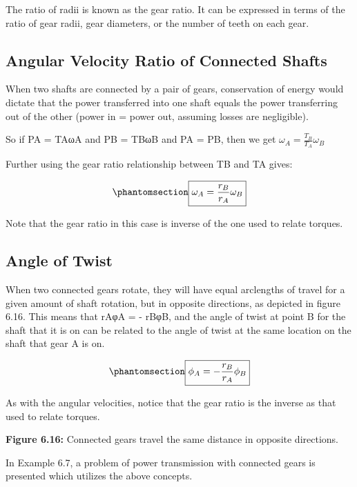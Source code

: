 \documentclass[
  letterpaper,
  DIV=11,
  numbers=noendperiod]{scrreprt}
\theoremstyle{definition}
\theoremstyle{remark}
\begin{document}
The ratio of radii is known as the gear ratio. It can be expressed in
terms of the ratio of gear radii, gear diameters, or the number of teeth
on each gear.

\subsection{Angular Velocity Ratio of Connected
Shafts}\label{angular-velocity-ratio-of-connected-shafts}

When two shafts are connected by a pair of gears, conservation of energy
would dictate that the power transferred into one shaft equals the power
transferring out of the other (power in = power out, assuming losses are
negligible).

So if PA = TAωA and PB = TBωB and PA = PB, then we get
\(\omega_A=\frac{T_B}{T_A} \omega_B\)

Further using the gear ratio relationship between TB and TA gives:

\begin{equation}\phantomsection\label{eq-6.6}{
\boxed{\omega_A=\frac{r_B}{r_A} \omega_B}
}\end{equation}

Note that the gear ratio in this case is inverse of the one used to
relate torques.

\subsection{Angle of Twist}\label{angle-of-twist}

When two connected gears rotate, they will have equal arclengths of
travel for a given amount of shaft rotation, but in opposite directions,
as depicted in figure 6.16. This means that rAφA = - rBφB, and the angle
of twist at point B for the shaft that it is on can be related to the
angle of twist at the same location on the shaft that gear A is on.

\begin{equation}\phantomsection\label{eq-6.7}{
\boxed{\phi_A=-\frac{r_B}{r_A} \phi_B}
}\end{equation}

As with the angular velocities, notice that the gear ratio is the
inverse as that used to relate torques.

\textbf{Figure 6.16:} Connected gears travel the same distance in
opposite directions.

In Example 6.7, a problem of power transmission with connected gears is
presented which utilizes the above concepts.
\end{document}
